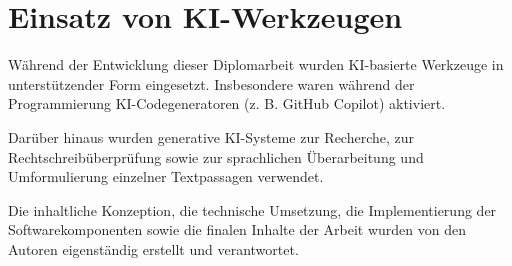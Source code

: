 \section*{Einsatz von KI-Werkzeugen}

Während der Entwicklung dieser Diplomarbeit wurden KI-basierte Werkzeuge
in unterstützender Form eingesetzt. Insbesondere waren während der
Programmierung KI-Codegeneratoren (z. B. GitHub Copilot) aktiviert.

Darüber hinaus wurden generative KI-Systeme zur Recherche, zur
Rechtschreibüberprüfung sowie zur sprachlichen Überarbeitung und
Umformulierung einzelner Textpassagen verwendet.

Die inhaltliche Konzeption, die technische Umsetzung, die Implementierung
der Softwarekomponenten sowie die finalen Inhalte der Arbeit wurden von
den Autoren eigenständig erstellt und verantwortet.
